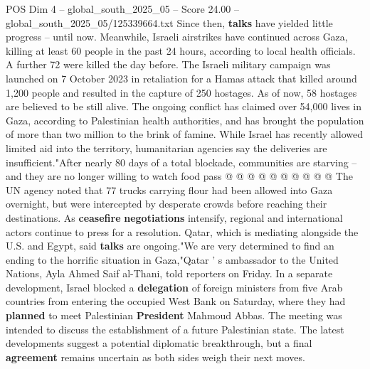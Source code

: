 \begin{textsample}{POS Dim 4 – global\_south\_2025\_05 – Score 24.00 – global\_south\_2025\_05/125339664.txt}
Since then, \textbf{talks} have yielded little progress -- until now.
Meanwhile, Israeli airstrikes have continued across Gaza, killing at least 60 people in the past 24 hours, according to local health officials.
A further 72 were killed the day before.
The Israeli military campaign was launched on 7 October 2023 in retaliation for a Hamas attack that killed around 1,200 people and resulted in the capture of 250 hostages.
As of now, 58 hostages are believed to be still alive.
The ongoing conflict has claimed over 54,000 lives in Gaza, according to Palestinian health authorities, and has brought the population of more than two million to the brink of famine.
While Israel has recently allowed limited aid into the territory, humanitarian agencies say the deliveries are insufficient."After nearly 80 days of a total blockade, communities are starving -- and they are no longer willing to watch food pass @ @ @ @ @ @ @ @ @ @ The UN agency noted that 77 trucks carrying flour had been allowed into Gaza overnight, but were intercepted by desperate crowds before reaching their destinations.
As \textbf{ceasefire} \textbf{negotiations} intensify, regional and international actors continue to press for a resolution.
Qatar, which is mediating alongside the U.S. and Egypt, said \textbf{talks} are ongoing."We are very determined to find an ending to the horrific situation in Gaza,"Qatar ' s ambassador to the United Nations, Ayla Ahmed Saif al-Thani, told reporters on Friday.
In a separate development, Israel blocked a \textbf{delegation} of foreign ministers from five Arab countries from entering the occupied West Bank on Saturday, where they had \textbf{planned} to meet Palestinian \textbf{President} Mahmoud Abbas.
The meeting was intended to discuss the establishment of a future Palestinian state.
The latest developments suggest a potential diplomatic breakthrough, but a final \textbf{agreement} remains uncertain as both sides weigh their next moves.

\end{textsample}
